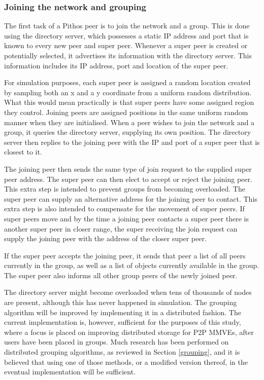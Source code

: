     \subsubsection{Joining the network and grouping}
    \label{network_join_implementation}

    The first task of a Pithos peer is to join the network and a group. This is done using the directory server, which possesses a static IP address and port that is known to every new peer and super peer. Whenever a super peer is created or potentially selected, it advertises its information with the directory server. This information includes its IP address, port and location of the super peer.

    For simulation purposes, each super peer is assigned a random location created by sampling both an x and a y coordinate from a uniform random distribution. What this would mean practically is that super peers have some assigned region they control. Joining peers are assigned positions in the same uniform random manner when they are initialised. When a peer wishes to join the network and a group, it queries the directory server, supplying its own position. The directory server then replies to the joining peer with the IP and port of a super peer that is closest to it.

    The joining peer then sends the same type of join request to the supplied super peer address. The super peer can then elect to accept or reject the joining peer. This extra step is intended to prevent groups from becoming overloaded. The super peer can supply an alternative address for the joining peer to contact. This extra step is also intended to compensate for the movement of super peers. If super peers move and by the time a joining peer contacts a super peer there is another super peer in closer range, the super receiving the join request can supply the joining peer with the address of the closer super peer.

    If the super peer accepts the joining peer, it sends that peer a list of all peers currently in the group, as well as a list of objects currently available in the group. The super peer also informs all other group peers of the newly joined peer.

    The directory server might become overloaded when tens of thousands of nodes are present, although this has never happened in simulation. The grouping algorithm will be improved by implementing it in a distributed fashion. The current implementation is, however, sufficient for the purposes of this study, where a focus is placed on improving distributed storage for P2P MMVEs, after users have been placed in groups. Much research has been performed on distributed grouping algorithms, as reviewed in Section \ref{grouping}, and it is believed that using one of those methods, or a modified version thereof, in the eventual implementation will be sufficient.

